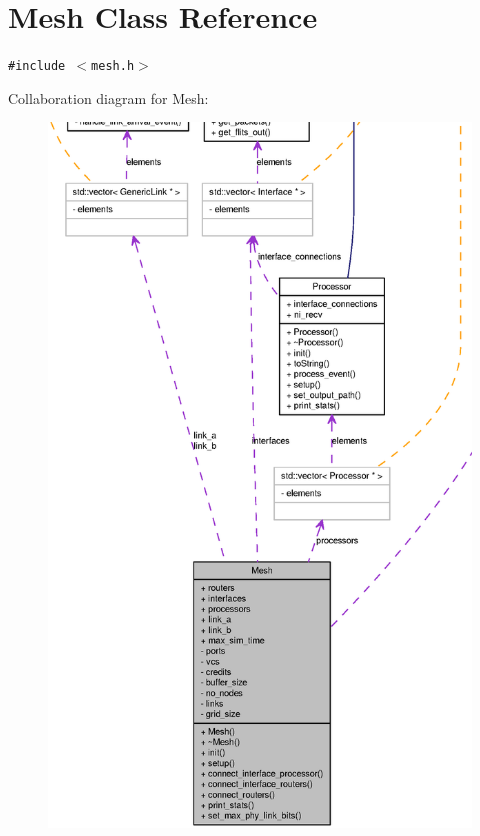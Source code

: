 \section{Mesh Class Reference}
\label{classMesh}
{\tt \#include $<$mesh.h$>$}

Collaboration diagram for Mesh:\nopagebreak
\begin{figure}[H]
\begin{center}
\leavevmode
\includegraphics[width=400pt]{classMesh__coll__graph}
\end{center}
\end{figure}
